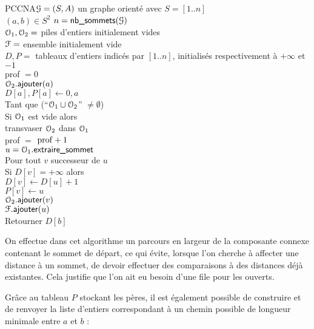 			\begin{algo}{PCCNA}{\(\EuScript{G} = (S,A)\) un graphe orienté avec \(S = [1..n]\) \\ \entspace \((a,b)\in S^2\)}{}{}
				\(n = \algfun{nb\_sommets}(\escr{G})\) \\
				\(\ouv_1,\ouv_2 = \) piles d'entiers initialement vides \\
				\(\ferm = \) ensemble initialement vide \\
				\(D,P = \) tableaux d'entiers indicés par \([1..n]\), initialisés respectivement à \(+\infty\) et \(-1\) \\
				prof \(= 0\) \\
				\(\ouv_2.\algfun{ajouter}(a)\) \\
				\(D[a], P[a] \gets 0,a\) \\
				Tant que (``\(\ouv_1 \cup \ouv_2\)'' \(\neq \emptyset\)) \\ \Indp
					Si \(\ouv_1\) est vide alors \\ \Indp
						transvaser \(\ouv_2\) dans \(\ouv_1\) \\
						prof \(=\) \(\rm{prof}+1\) \\ \Indm
					\(u = \ouv_1.\algfun{extraire\_sommet}\) \\
					Pour tout \(v\) successeur de \(u\) \\ \Indp
						Si \(D[v] = +\infty\) alors \\ \Indp
							\(D[v] \gets D[u] + 1\) \\
							\(P[v] \gets u\) \\
							\(\ouv_2.\algfun{ajouter}(v)\) \\ \Indm \Indm
					\(\ferm.\algfun{ajouter}(u)\) \\ \Indm
				Retourner \(D[b]\)
			\end{algo}
		
			\begin{Remarque}
				On effectue dans cet algorithme un parcours en largeur de la composante connexe contenant le sommet de départ, ce qui évite, lorsque l'on cherche à affecter une distance à un sommet, de devoir effectuer des comparaisons à des distances déjà existantes. Cela justifie que l'on ait eu besoin d'une file pour les ouverts.
			\end{Remarque}
			
			Grâce au tableau \(P\) stockant les pères, il est également possible de construire et de renvoyer la liste d'entiers correspondant à un chemin possible de longueur minimale entre \(a\) et \(b\) :
		
